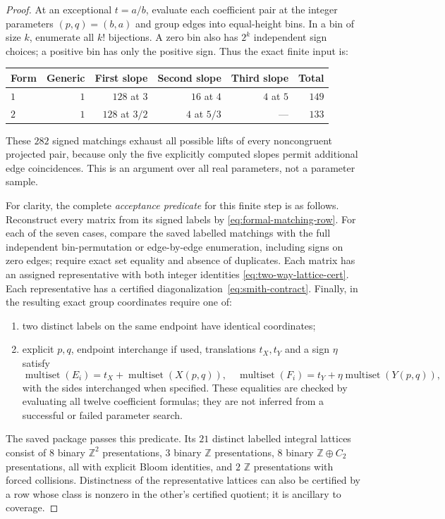 \documentclass[11pt]{article}
\theoremstyle{remark}
\newcommand{\Z}{\mathbb Z}
\begin{document}
\begin{proof}
At an exceptional $t=a/b$, evaluate each coefficient pair at the integer
parameters $(p,q)=(b,a)$ and group edges into equal-height bins. In a bin
of size $k$, enumerate all $k!$ bijections. A zero bin also has $2^k$
independent sign choices; a positive bin has only the positive sign.
Thus the exact finite input is:
\begin{center}\small
\begin{tabular}{lrrrrr}
\toprule
Form & Generic & First slope & Second slope & Third slope & Total\\
\midrule
$1$ & $1$ & $128$ at $3$ & $16$ at $4$ & $4$ at $5$ & $149$\\
$2$ & $1$ & $128$ at $3/2$ & $4$ at $5/3$ & --- & $133$\\
\bottomrule
\end{tabular}
\end{center}
These $282$ signed matchings exhaust all possible lifts of every
noncongruent projected pair, because only the five explicitly computed
slopes permit additional edge coincidences. This is an argument over all
real parameters, not a parameter sample.

For clarity, the complete \emph{acceptance predicate} for this finite
step is as follows. Reconstruct every matrix from its signed labels by
\eqref{eq:formal-matching-row}. For each of the seven cases, compare the
saved labelled matchings with the full independent bin-permutation or
edge-by-edge enumeration, including signs on zero edges; require exact
set equality and absence of duplicates. Each matrix has an assigned
representative with both integer identities
\eqref{eq:two-way-lattice-cert}. Each representative has a certified
diagonalization~\eqref{eq:smith-contract}. Finally, in the resulting
exact group coordinates require one of:
\begin{enumerate}
 \item two distinct labels on the same endpoint have identical coordinates;
 \item explicit $p,q$, endpoint interchange if used, translations $t_X,t_Y$
 and a sign $\eta$ satisfy
 \[
 \operatorname{multiset}(E_i)=t_X+\operatorname{multiset}(X(p,q)),\quad
 \operatorname{multiset}(F_i)=t_Y+\eta\operatorname{multiset}(Y(p,q)),
 \]
 with the sides interchanged when specified. These equalities are checked
 by evaluating all twelve coefficient formulas; they are not inferred
 from a successful or failed parameter search.
\end{enumerate}
The saved package passes this predicate. Its $21$ distinct labelled
integral lattices consist of $8$ binary $\Z^2$ presentations, $3$ binary
$\Z$ presentations, $8$ binary $\Z\oplus C_2$ presentations, all with
explicit Bloom identities, and $2$ $\Z$ presentations with forced
collisions. Distinctness of the representative lattices can also be
certified by a row whose class is nonzero in the other's certified quotient;
it is ancillary to coverage.


\end{proof}
\end{document}
